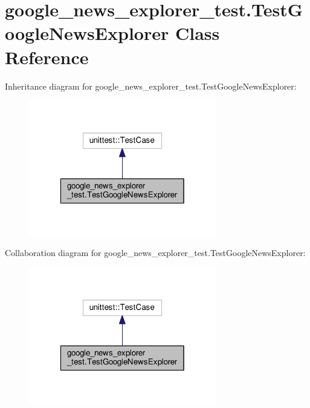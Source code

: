 \hypertarget{classgoogle__news__explorer__test_1_1TestGoogleNewsExplorer}{\section{google\-\_\-news\-\_\-explorer\-\_\-test.\-Test\-Google\-News\-Explorer Class Reference}
\label{classgoogle__news__explorer__test_1_1TestGoogleNewsExplorer}
}


Inheritance diagram for google\-\_\-news\-\_\-explorer\-\_\-test.\-Test\-Google\-News\-Explorer\-:
\nopagebreak
\begin{figure}[H]
\begin{center}
\leavevmode
\includegraphics[width=232pt]{classgoogle__news__explorer__test_1_1TestGoogleNewsExplorer__inherit__graph}
\end{center}
\end{figure}


Collaboration diagram for google\-\_\-news\-\_\-explorer\-\_\-test.\-Test\-Google\-News\-Explorer\-:
\nopagebreak
\begin{figure}[H]
\begin{center}
\leavevmode
\includegraphics[width=232pt]{classgoogle__news__explorer__test_1_1TestGoogleNewsExplorer__coll__graph}
\end{center}
\end{figure}
